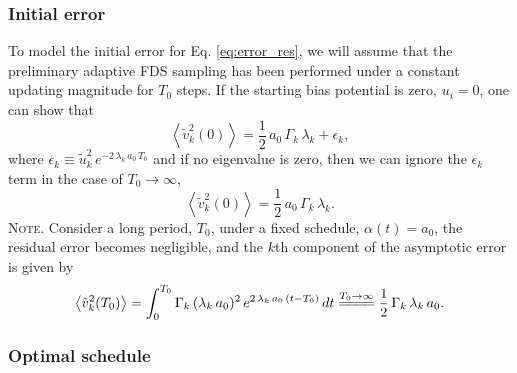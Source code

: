 \documentclass[reprint, superscriptaddress, floatfix]{revtex4-1}
\newcommand{\note}[1]{{\color{DarkGreen}\footnotesize \textsc{Note.} #1}}
\begin{document}
\subsubsection{\label{sec:eqlerr}
Initial error
}



To model the initial error for Eq. \eqref{eq:error_res},
we will assume that
the preliminary adaptive FDS sampling has been
performed under a constant updating magnitude for $T_0$ steps.
%
If the starting bias potential is zero, $u_i = 0$,
one can show that
\begin{equation}
  \left\langle
    {\tilde v}_k^2(0)
  \right\rangle
  = \frac 1 2 \, a_0 \, \Gamma_k \, \lambda_k
  + \epsilon_k
  ,
  \label{eq:xt2_eql1}
\end{equation}
%
where
$\epsilon_k \equiv \tilde u_k^2 \, e^{-2\, \lambda_k \, a_0 \, T_0}$
and if no eigenvalue is zero,
then we can ignore the $\epsilon_k$ term
in the case of $T_0 \to \infty$,
%
\begin{equation}
  \left\langle
    {\tilde v}_k^2(0)
  \right\rangle
  = \frac 1 2 \, a_0 \, \Gamma_k \, \lambda_k
  .
  \label{eq:xt2_eql}
\end{equation}
%
\note{
Consider a long period, $T_0$, under a fixed schedule,
$\alpha(t) = a_0$,
the residual error becomes negligible, and
the $k$th component of the asymptotic error
is given by
%
\begin{align*}
  \left\langle
    {\tilde v}_k^2(T_0)
  \right\rangle
  =
  \int_0^{T_0}
    \Gamma_k \, (\lambda_k \, a_0)^2 \,
      e^{ 2 \, \lambda_k \, a_0 \, (t - T_0) }
    \, dt
  \stackrel{ T_0 \to \infty }
  { =\joinrel=\joinrel=\joinrel= }
  \frac 1 2 \, \Gamma_k \, \lambda_k \, a_0
  .
\notag
\end{align*}
}
%



\subsubsection{\label{sec:optschedule}
Optimal schedule}
\end{document}
